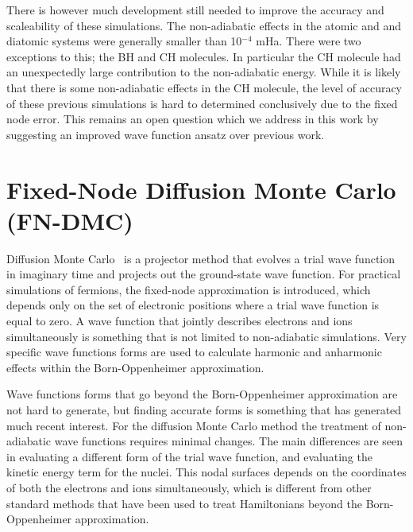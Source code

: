 \documentclass[aip,jcp,numerical,reprint]{revtex4-1}
\begin{document}
There is however much development still needed to improve the accuracy and scaleability of these simulations.  The non-adiabatic effects in the atomic and and diatomic systems were generally smaller than 10$^{-4}$ mHa. There were two exceptions to this; the BH and CH molecules. In particular the CH molecule had an unexpectedly large contribution to the non-adiabatic energy.   While it is likely that there is some non-adiabatic effects in the CH molecule, the level of accuracy of these previous simulations is hard to determined conclusively due to the fixed node error.   This remains an open question which we address in this work by suggesting an improved wave function ansatz over previous work.


\section{Fixed-Node Diffusion Monte Carlo (FN-DMC)}
Diffusion Monte Carlo~\cite{Anderson_DMC,lester1,Stuart_Review,Needs_Review,Needs_Old_Review,QMC_Review} is a projector method that evolves a trial wave function in imaginary time and projects out the ground-state wave function. For practical simulations of fermions, the fixed-node approximation is introduced, which depends only on the set of electronic positions where a trial wave function is equal to zero.  A wave function that jointly describes electrons and ions simultaneously is something that is not limited to non-adiabatic simulations.    Very specific wave functions forms are used to calculate harmonic and anharmonic effects within the Born-Oppenheimer approximation.  

  Wave functions forms that go beyond the Born-Oppenheimer approximation are not hard to generate, but finding accurate forms is something that has generated  much recent interest.  For the diffusion Monte Carlo method the treatment of non-adiabatic wave functions requires minimal changes.  The main differences are seen in evaluating a different form of the trial wave function, and  evaluating the kinetic energy term for the nuclei.   This nodal surfaces  depends on the coordinates of both the electrons and ions simultaneously, which is different from other standard methods that have been used to treat Hamiltonians beyond the Born-Oppenheimer approximation.%
\end{document}
